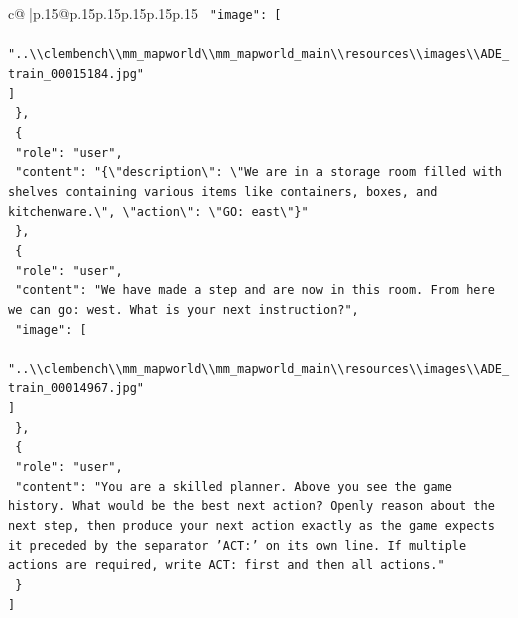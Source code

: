 \documentclass{article}
\begin{document}
{\begin{supertabular}{c@{$\;$}|p{.15\linewidth}@{}p{.15\linewidth}p{.15\linewidth}p{.15\linewidth}p{.15\linewidth}p{.15\linewidth}}
{{{\texttt{    "image": {[}} \\
\texttt{      "..\textbackslash{}\textbackslash{}clembench\textbackslash{}\textbackslash{}mm\_mapworld\textbackslash{}\textbackslash{}mm\_mapworld\_main\textbackslash{}\textbackslash{}resources\textbackslash{}\textbackslash{}images\textbackslash{}\textbackslash{}ADE\_train\_00015184.jpg"} \\
\texttt{    {]}} \\
\texttt{  \},} \\
\texttt{  \{} \\
\texttt{    "role": "user",} \\
\texttt{    "content": "\{\textbackslash{}"description\textbackslash{}": \textbackslash{}"We are in a storage room filled with shelves containing various items like containers, boxes, and kitchenware.\textbackslash{}", \textbackslash{}"action\textbackslash{}": \textbackslash{}"GO: east\textbackslash{}"\}"} \\
\texttt{  \},} \\
\texttt{  \{} \\
\texttt{    "role": "user",} \\
\texttt{    "content": "We have made a step and are now in this room. From here we can go: west. What is your next instruction?",} \\
\texttt{    "image": {[}} \\
\texttt{      "..\textbackslash{}\textbackslash{}clembench\textbackslash{}\textbackslash{}mm\_mapworld\textbackslash{}\textbackslash{}mm\_mapworld\_main\textbackslash{}\textbackslash{}resources\textbackslash{}\textbackslash{}images\textbackslash{}\textbackslash{}ADE\_train\_00014967.jpg"} \\
\texttt{    {]}} \\
\texttt{  \},} \\
\texttt{  \{} \\
\texttt{    "role": "user",} \\
\texttt{    "content": "You are a skilled planner. Above you see the game history. What would be the best next action? Openly reason about the next step, then produce your next action exactly as the game expects it preceded by the separator 'ACT:' on its own line. If multiple actions are required, write ACT: first and then all actions."} \\
\texttt{  \}} \\
\texttt{{]}} \\
            }
        }
    }
     \\ \\


\end{supertabular}}
\end{document}

